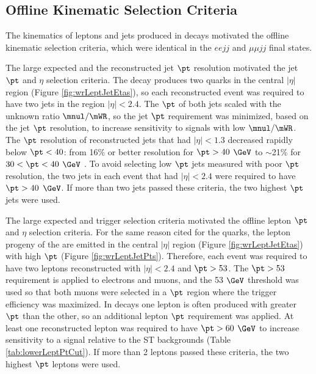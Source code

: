 \subsection{Offline Kinematic Selection Criteria}
The kinematics of leptons and jets produced in \WR decays motivated the offline kinematic selection criteria, which were identical in 
the $eejj$ and $\mu\mu jj$ final states.

The large expected \mWR and the reconstructed jet $\pt$ resolution motivated the jet $\pt$ and $\eta$ selection criteria.  The \WR decay 
produces two quarks in the central $|\eta|$ region (Figure \ref{fig:wrLeptJetEtas}), so each reconstructed event was required to have two 
jets in the region $|\eta| < 2.4$.  The $\pt$ of both jets scaled with the unknown ratio $\mnul/\mWR$, so the jet $\pt$ requirement was 
minimized, based on the jet $\pt$ resolution, to increase sensitivity to signals with low $\mnul/\mWR$.  The $\pt$ resolution of 
reconstructed jets that had $|\eta| < 1.3$ decreased rapidly below $\pt < 40$: from 16\% or better resolution for $\pt > 40$ $\GeV$ to 
$\sim$21\% for $30 < \pt < 40$ $\GeV$ \cite{jetResolutionInCollisions}.  To avoid selecting low $\pt$ jets measured with poor $\pt$ 
resolution, the two jets in each event that had $|\eta| < 2.4$ were required to have $\pt > 40$ $\GeV$.  If more than two jets passed 
these criteria, the two highest $\pt$ jets were used.

The large expected \mWR and trigger selection criteria motivated the offline lepton $\pt$ and $\eta$ selection criteria.  For the same 
reason cited for the \WR quarks, the lepton progeny of the \WR are emitted in the central $|\eta|$ region (Figure \ref{fig:wrLeptJetEtas}) 
with high $\pt$ (Figure \ref{fig:wrLeptJetPts}).  Therefore, each event was required to have two leptons reconstructed with $|\eta| < 2.4$ 
and $\pt > 53$.  The $\pt > 53$ requirement is applied to electrons and muons, and the 53 $\GeV$ threshold was used so that both muons 
were selected in a $\pt$ region where the trigger efficiency was maximized.  In \WR decays one lepton is often produced with greater 
$\pt$ than the other, so an additional lepton $\pt$ requirement was applied.  At least one reconstructed lepton was required to have 
$\pt > 60$ $\GeV$ to increase sensitivity to a \WR signal relative to the ST backgrounds (Table \ref{tab:lowerLeptPtCut}).  If more than 
2 leptons passed these criteria, the two highest $\pt$ leptons were used.


